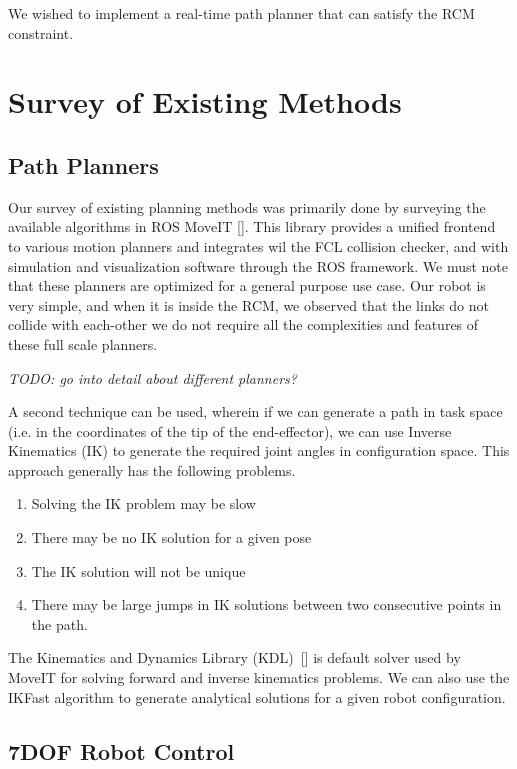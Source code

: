 \documentclass[BTech]{iitmdiss}
\begin{document}
    We wished to implement a real-time path planner that can satisfy the RCM constraint.


    \section{Survey of Existing Methods}

    \subsection{Path Planners}
    Our survey of existing planning methods was primarily done by surveying the available algorithms in ROS MoveIT [\cite{Coleman_Sucan_Chitta_Correll_2014}].
    This library provides a unified frontend to various motion planners and integrates wil the FCL collision checker, and with simulation and visualization software through the ROS framework.
    We must note that these planners are optimized for a general purpose use case.
    Our robot is very simple, and when it is inside the RCM, we observed that the links do not collide with each-other we do not require all the complexities and features of these full scale planners.

    \emph{TODO: go into detail about different planners?}

    A second technique can be used, wherein if we can generate a path in task space (i.e. in the coordinates of the tip of the end-effector),
    we can use Inverse Kinematics (IK) to generate the required joint angles in configuration space. This approach generally has the following problems.
    \begin{enumerate}
        \item Solving the IK problem may be slow
        \item There may be no IK solution for a given pose
        \item The IK solution will not be unique
        \item There may be large jumps in IK solutions between two consecutive points in the path.
    \end{enumerate}

    The Kinematics and Dynamics Library (KDL)~[\cite{kdl-url}] is default solver used by MoveIT for solving forward and inverse kinematics problems.
    We can also use the IKFast algorithm to generate analytical solutions for a given robot configuration.

    \subsection{7DOF Robot Control}
\end{document}
